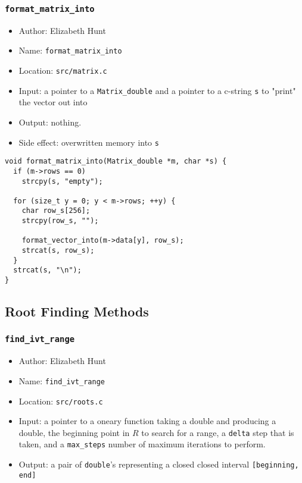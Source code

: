 \documentclass[11pt]{article}
\begin{document}
\subsubsection{\texttt{format\_matrix\_into}}
\label{sec:org308ee0d}
\begin{itemize}
\item Author: Elizabeth Hunt
\item Name: \texttt{format\_matrix\_into}
\item Location: \texttt{src/matrix.c}
\item Input: a pointer to a \texttt{Matrix\_double} and a pointer to a c-string \texttt{s} to "print" the vector out
into
\item Output: nothing.
\item Side effect: overwritten memory into \texttt{s}
\end{itemize}

\begin{verbatim}
void format_matrix_into(Matrix_double *m, char *s) {
  if (m->rows == 0)
    strcpy(s, "empty");

  for (size_t y = 0; y < m->rows; ++y) {
    char row_s[256];
    strcpy(row_s, "");

    format_vector_into(m->data[y], row_s);
    strcat(s, row_s);
  }
  strcat(s, "\n");
}
\end{verbatim}
\subsection{Root Finding Methods}
\label{sec:org8981156}
\subsubsection{\texttt{find\_ivt\_range}}
\label{sec:orga5835b0}
\begin{itemize}
\item Author: Elizabeth Hunt
\item Name: \texttt{find\_ivt\_range}
\item Location: \texttt{src/roots.c}
\item Input: a pointer to a oneary function taking a double and producing a double, the beginning point
in \(R\) to search for a range, a \texttt{delta} step that is taken, and a \texttt{max\_steps} number of maximum
iterations to perform.
\item Output: a pair of \texttt{double}'s representing a closed closed interval \texttt{[beginning, end]}
\end{itemize}
\end{document}
